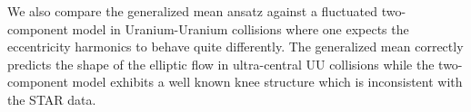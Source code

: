 \documentclass[aps,prl,reprint,amsmath,nofootinbib]{revtex4-1}
\begin{document}
We also compare the generalized mean ansatz against a fluctuated two-component model in Uranium-Uranium
collisions where one expects the eccentricity harmonics to behave quite differently. The generalized mean
correctly predicts the shape of the elliptic flow in ultra-central UU collisions while the two-component model
exhibits a well known knee structure which is inconsistent with the STAR data.



\end{document}
